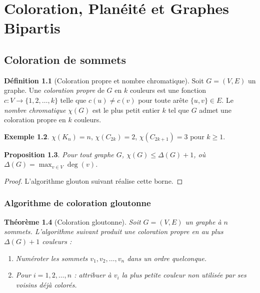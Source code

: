 \documentclass[12pt,a4paper,openany]{book}
\theoremstyle{definition}
\newtheorem{definition}{Définition}[chapter]
\newtheorem{exemple}[definition]{Exemple}
\theoremstyle{plain}
\newtheorem{theoreme}[definition]{Théorème}
\newtheorem{proposition}[definition]{Proposition}
\theoremstyle{remark}
\begin{document}
\chapter{Coloration, Planéité et Graphes Bipartis}
\label{ch:coloration-planarite}

\section{Coloration de sommets}
\label{sec:coloration-sommets}

\begin{definition}[Coloration propre et nombre chromatique]
\label{def:coloration}
Soit $G=(V,E)$ un graphe. Une \emph{coloration propre} de $G$ en $k$
couleurs est une fonction $c : V \to \{1, 2, \dots, k\}$ telle que
$c(u) \neq c(v)$ pour toute arête $\{u,v\} \in E$. Le \emph{nombre
chromatique} $\chi(G)$ est le plus petit entier $k$ tel que $G$ admet
une coloration propre en $k$ couleurs.
\end{definition}

\begin{exemple}
$\chi(K_n) = n$, $\chi(C_{2k}) = 2$, $\chi(C_{2k+1}) = 3$ pour
$k \geq 1$.
\end{exemple}

\begin{proposition}
\label{prop:chi-borne}
Pour tout graphe $G$, $\chi(G) \leq \Delta(G) + 1$, où
$\Delta(G) = \max_{v \in V} \deg(v)$.
\end{proposition}

\begin{proof}
L'algorithme glouton suivant réalise cette borne.
\end{proof}

\subsection{Algorithme de coloration gloutonne}
\label{subsec:coloration-gloutonne}

\begin{theoreme}[Coloration gloutonne]
\label{thm:coloration-gloutonne}
Soit $G=(V,E)$ un graphe à $n$ sommets. L'algorithme suivant produit une
coloration propre en au plus $\Delta(G)+1$ couleurs :
\begin{enumerate}
  \item Numéroter les sommets $v_1, v_2, \dots, v_n$ dans un ordre
        quelconque.
  \item Pour $i = 1, 2, \dots, n$ : attribuer à $v_i$ la plus petite
        couleur non utilisée par ses voisins déjà colorés.
\end{enumerate}
\end{theoreme}
\end{document}
